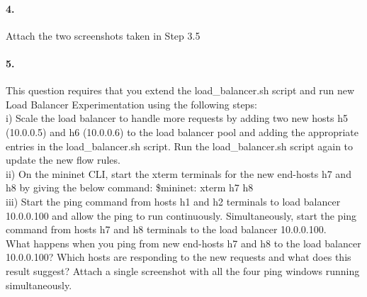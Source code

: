 \documentclass[a4paper]{article}
\begin{document}
\paragraph{4. } Attach the two screenshots taken in Step 3.5

\paragraph{5. } This question requires that you extend the load\_balancer.sh script and run new Load Balancer Experimentation using the following steps: \\

i) Scale the load balancer to handle more requests by adding two new hosts h5 (10.0.0.5) and h6 (10.0.0.6) to the load balancer pool and adding the appropriate entries in the load\_balancer.sh script. Run the load\_balancer.sh script again to update the new flow rules. \\

ii) On the mininet CLI, start the xterm terminals for the new end-hosts h7 and h8 by giving the below command: \$mininet: xterm h7 h8 \\

iii) Start the ping command from hosts h1 and h2 terminals to load balancer 10.0.0.100 and allow the ping to run continuously. Simultaneously, start the ping command from hosts h7 and h8 terminals to the load balancer 10.0.0.100. \\

What happens when you ping from new end-hosts h7 and h8 to the load balancer 10.0.0.100? Which hosts are responding to the new requests and what does this result suggest? Attach a single screenshot with all the four ping windows running simultaneously.
\end{document}
